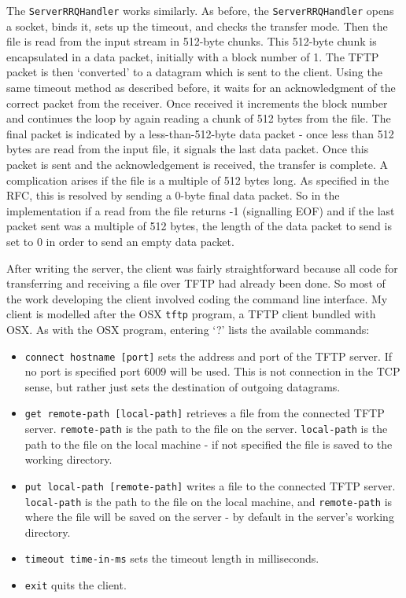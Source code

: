 \documentclass[a4paper]{article}
\newcommand{\code}{\texttt}
\begin{document}
The \code{ServerRRQHandler} works similarly. As before, the \code{ServerRRQHandler} opens a socket, binds it, sets up the timeout, and checks the transfer mode. Then the file is read from the input stream in 512-byte chunks. This 512-byte chunk is encapsulated in a data packet, initially with a block number of 1. The TFTP packet is then `converted' to a datagram which is sent to the client. Using the same timeout method as described before, it waits for an acknowledgment of the correct packet from the receiver. Once received it increments the block number and continues the loop by again reading a chunk of 512 bytes from the file. The final packet is indicated by a less-than-512-byte data packet - once less than 512 bytes are read from the input file, it signals the last data packet. Once this packet is sent and the acknowledgement is received, the transfer is complete. A complication arises if the file is a multiple of 512 bytes long. As specified in the RFC, this is resolved by sending a 0-byte final data packet. So in the implementation if a read from the file returns -1 (signalling EOF) and if the last packet sent was a multiple of 512 bytes, the length of the data packet to send is set to 0 in order to send an empty data packet.

After writing the server, the client was fairly straightforward because all code for transferring and receiving a file over TFTP had already been done. So most of the work developing the client involved coding the command line interface. My client is modelled after the OSX \code{tftp} program, a TFTP client bundled with OSX. As with the OSX program, entering `?' lists the available commands:
\begin{itemize}
\item \code{connect hostname [port]} sets the address and port of the TFTP server. If no port is specified port 6009 will be used. This is not connection in the TCP sense, but rather just sets the destination of outgoing datagrams.
\item \code{get remote-path [local-path]} retrieves a file from the connected TFTP server. \code{remote-path} is the path to the file on the server. \code{local-path} is the path to the file on the local machine - if not specified the file is saved to the working directory. 
\item \code{put local-path [remote-path]} writes a file to the connected TFTP server. \code{local-path} is the path to the file on the local machine, and \code{remote-path} is where the file will be saved on the server - by default in the server's working directory.
\item \code{timeout time-in-ms} sets the timeout length in milliseconds.
\item \code{exit} quits the client.
\end{itemize}
\end{document}
